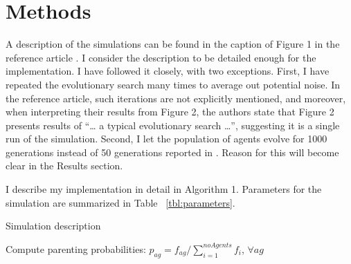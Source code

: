 \documentclass[10pt,a4paper,onecolumn]{article}
\begin{document}
\section{Methods}\label{methods}

A description of the simulations can be found in the caption of Figure 1
in the reference article \autocite{hinton1987learning}. I consider the
description to be detailed enough for the implementation. I have
followed it closely, with two exceptions. First, I have repeated the
evolutionary search many times to average out potential noise. In the
reference article, such iterations are not explicitly mentioned, and
moreover, when interpreting their results from Figure 2, the authors
state that Figure 2 presents results of ``\ldots{} a typical
evolutionary search \ldots{}'', suggesting it is a single run of the
simulation. Second, I let the population of agents evolve for 1000
generations instead of 50 generations reported in
\textcite{hinton1987learning}. Reason for this will become clear in the
Results section.

I describe my implementation in detail in Algorithm 1. Parameters for
the simulation are summarized in Table ~\ref{tbl:parameters}.

\begin{algorithm}
\caption{Simulation description}
    \begin{algorithmic}[1]
             
                      \EndIf
                \EndFor
            \EndFor
            \State Compute parenting probabilities: 
            \State $p_{ag}=f_{ag}/\sum_{i=1}^{noAgents}f_{i}$, $\forall ag$
             
            \EndFor
        \EndFor
    \EndFor
    \end{algorithmic}
\end{algorithm}
\end{document}
